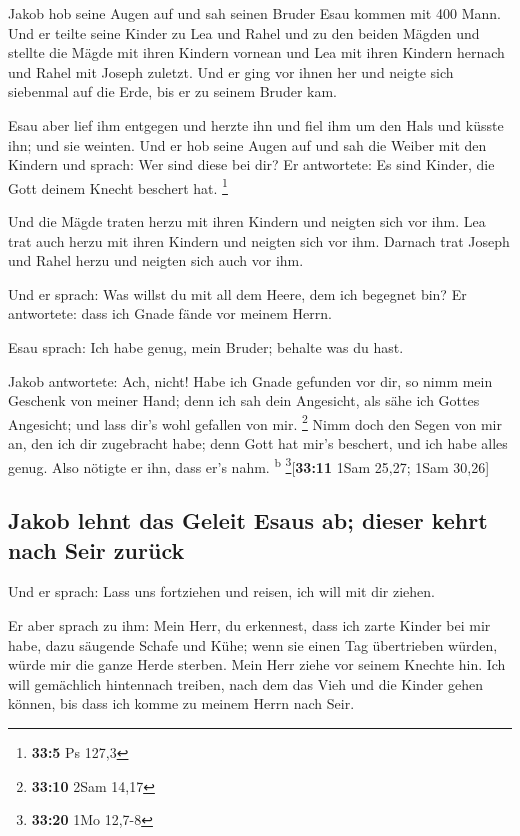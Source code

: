  Jakob hob seine Augen auf und sah seinen Bruder Esau
kommen mit 400 Mann. Und er teilte seine Kinder zu Lea und Rahel und zu
den beiden Mägden  und stellte die Mägde mit ihren Kindern
vornean und Lea mit ihren Kindern hernach und Rahel mit Joseph zuletzt.
 Und er ging vor ihnen her und neigte sich siebenmal auf
die Erde, bis er zu seinem Bruder kam.

 Esau aber lief ihm entgegen und herzte ihn und fiel ihm
um den Hals und küsste ihn; und sie weinten.  Und er hob
seine Augen auf und sah die Weiber mit den Kindern und sprach: Wer sind
diese bei dir? Er antwortete: Es sind Kinder, die Gott deinem Knecht
beschert hat. \footnote{\textbf{33:5} Ps 127,3}

 Und die Mägde traten herzu mit ihren Kindern und neigten
sich vor ihm.  Lea trat auch herzu mit ihren Kindern und
neigten sich vor ihm. Darnach trat Joseph und Rahel herzu und neigten
sich auch vor ihm.

 Und er sprach: Was willst du mit all dem Heere, dem ich
begegnet bin? Er antwortete: dass ich Gnade fände vor meinem Herrn.

 Esau sprach: Ich habe genug, mein Bruder; behalte was du
hast.

 Jakob antwortete: Ach, nicht! Habe ich Gnade gefunden
vor dir, so nimm mein Geschenk von meiner Hand; denn ich sah dein
Angesicht, als sähe ich Gottes Angesicht; und lass dir's wohl gefallen
von mir. \footnote{\textbf{33:10} 2Sam 14,17}  Nimm doch
den Segen von mir an, den ich dir zugebracht habe; denn Gott hat mir's
beschert, und ich habe alles genug. Also nötigte er ihn, dass er's nahm.
\textsuperscript{b} \footnote{\textbf{33:20} 1Mo 12,7-8}{[}\textbf{33:11}
1Sam 25,27; 1Sam 30,26{]}

\hypertarget{jakob-lehnt-das-geleit-esaus-ab-dieser-kehrt-nach-seir-zuruxfcck}{%
\subsection{Jakob lehnt das Geleit Esaus ab; dieser kehrt nach Seir
zurück}\label{jakob-lehnt-das-geleit-esaus-ab-dieser-kehrt-nach-seir-zuruxfcck}}

 Und er sprach: Lass uns fortziehen und reisen, ich will
mit dir ziehen.

 Er aber sprach zu ihm: Mein Herr, du erkennest, dass ich
zarte Kinder bei mir habe, dazu säugende Schafe und Kühe; wenn sie einen
Tag übertrieben würden, würde mir die ganze Herde sterben.
 Mein Herr ziehe vor seinem Knechte hin. Ich will
gemächlich hintennach treiben, nach dem das Vieh und die Kinder gehen
können, bis dass ich komme zu meinem Herrn nach Seir.

